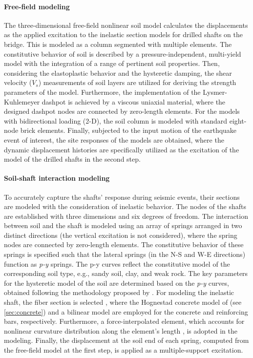 \paragraph{Free-field modeling}
The three-dimensional free-field nonlinear soil model calculates the displacements as the applied excitation to the inelastic section models for drilled shafts on the bridge. This is modeled as a column segmented with multiple elements. The constitutive behavior of soil is described by a pressure-independent, multi-yield model with the integration of a range of pertinent soil properties. Then, considering the elastoplastic behavior and the hysteretic damping, the shear velocity ($V_s$) measurements of soil layers are utilized for deriving the strength parameters of the model. Furthermore, the implementation of the Lysmer-Kuhlemeyer dashpot \citep{lysmer1969finite} is achieved by a viscous uniaxial material, where the designed dashpot nodes are connected by zero-length elements. 
For the models with bidirectional loading (2-D), the soil column is modeled with standard eight-node brick elements. 
Finally, subjected to the input motion of the earthquake event of interest, the site responses of the models are obtained, where the dynamic displacement histories are specifically utilized as the excitation of the model of the drilled shafts in the second step.

\paragraph{Soil-shaft interaction modeling}
To accurately capture the shafts' response during seismic events, their sections are modeled with the consideration of inelastic behavior. 
The nodes of the shafts are established with three dimensions and six degrees of freedom. The interaction between soil and the shaft is modeled using an array of springs arranged in two distinct directions (the vertical excitation is not considered), where the spring nodes are connected by zero-length elements. 
The constitutive behavior of these springs is specified such that the lateral springs (in the N-S and W-E directions) function as \emph{p-y} springs. The p-y curves reflect the constitutive model of the corresponding soil type, e.g., sandy soil, clay, and weak rock. The key parameters for the hysteretic model of the soil are determined based on the {\em{p-y}} curves, obtained following the methodology proposed by \cite{reese1978field}. 
For modeling the inelastic shaft, the fiber section is selected \cite{matinrad2023asce}, where the Hognestad concrete model of \cite{yassin1994nonlinear} (see \cref{sec:concrete}) and a bilinear model are employed for the concrete and reinforcing bars, respectively. Furthermore, a force-interpolated element, which accounts for nonlinear curvature distribution along the element's length \cite{spacone1992beam}, is adopted in the modeling. Finally, the displacement at the soil end of each spring, computed from the free-field model at the first step, is applied as a multiple-support excitation.

